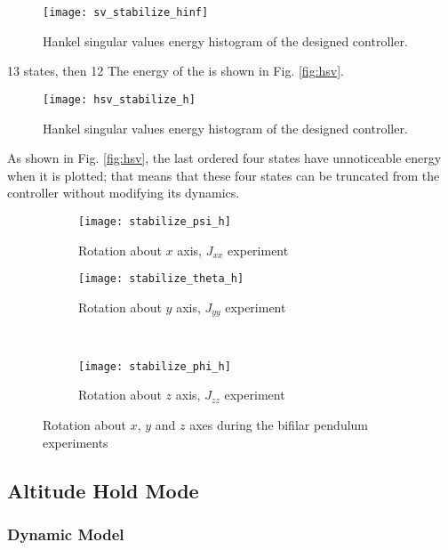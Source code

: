 \begin{figure}[h]
\begin{center}
\texttt{[image: sv\_stabilize\_hinf]}  
\caption{Hankel singular values energy histogram of the designed controller.} 
\label{fig:sv_stabilize_hinf}
\end{center}
\end{figure}
13 states, then 12
The energy of the  is shown in Fig. \ref{fig:hsv}.
\begin{figure}[h]
\begin{center}
\texttt{[image: hsv\_stabilize\_h]}  
\caption{Hankel singular values energy histogram of the designed controller.} 
\label{fig:hsv_stabilize_h}
\end{center}
\end{figure}
As shown in Fig. \ref{fig:hsv}, the last ordered four states have unnoticeable energy when it is plotted; that means that these four states can be truncated from the controller without modifying its dynamics.
\begin{figure}[H]
\begin{subfigure}{.5\linewidth}
\centering
\texttt{[image: stabilize\_psi\_h]}
\caption{Rotation about $x$ axis, $J_{xx}$ experiment}
\label{fig:stabilize_psi_h}
\end{subfigure}%
\begin{subfigure}{.5\linewidth}
\centering
\texttt{[image: stabilize\_theta\_h]}
\caption{Rotation about $y$ axis, $J_{yy}$ experiment}
\label{fig:stabilize_theta_h}
\end{subfigure}\\[1ex]
\begin{subfigure}{\linewidth}
\centering
\texttt{[image: stabilize\_phi\_h]}
\caption{Rotation about $z$ axis, $J_{zz}$ experiment}
\label{fig:stabilize_psi_h}
\end{subfigure}
\caption{Rotation about $x$, $y$ and $z$ axes during the bifilar pendulum experiments}
\label{fig:stabilize_lqi}
\end{figure}


\subsection{Altitude Hold Mode}
\subsubsection{Dynamic Model}

